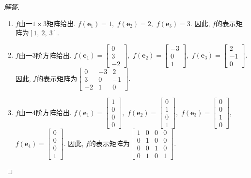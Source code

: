 \documentclass[UTF8]{ctexart}
\newcommand\bs[1]{\boldsymbol{ #1}}
\begin{document}
\begin{proof}[解答]
\begin{enumerate}
\item $f$由一$1\times 3$矩阵给出. $f(\bs e_1) = 1,$ $f(\bs e_2) = 2, $ $f(\bs e_3) = 3.$ 因此, $f$的表示矩阵为$[1,~ 2, ~ 3].$

\item $f$由一$3$阶方阵给出. $f(\bs e_1) =  \begin{bmatrix}
				0 \\  3\\  -2
			\end{bmatrix},$ $f(\bs e_2) = \begin{bmatrix}
				-3\\  0 \\ 1
			\end{bmatrix}, $ $f(\bs e_3) = \begin{bmatrix}
				2\\ -1 \\  0
			\end{bmatrix}.$ 因此, $f$的表示矩阵为$ \begin{bmatrix}
				0 & -3 & 2  \\  3 &  0 & -1\\  -2 &  1 & 0
			\end{bmatrix}.$

\item $f$由一$4$阶方阵给出. $f(\bs e_1) =  \begin{bmatrix}
				1 \\  0\\  0\\ 0
			\end{bmatrix},$ $f(\bs e_2) = \begin{bmatrix}
				0\\  1 \\ 0 \\ 1
			\end{bmatrix}, $ $f(\bs e_3) = \begin{bmatrix}
				0 \\ 0 \\ 1 \\ 0
			\end{bmatrix},$ $f(\bs e_4) = \begin{bmatrix}
				0 \\ 0  \\ 0 \\ 1
			\end{bmatrix}.$ 因此, $f$的表示矩阵为$ \begin{bmatrix}
				1 & 0 & 0 &0 \\  0 & 1 & 0 & 0\\  0 & 0 & 1 & 0\\ 0 & 1 & 0 & 1
			\end{bmatrix}.$
\end{enumerate}
\end{proof}
\end{document}
